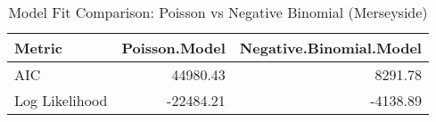 \begin{table}

\caption{\label{tab:tab:model_comparison_london}Model Fit Comparison: Poisson vs Negative Binomial (Merseyside)}
\centering
\begin{tabular}[t]{lrr}
\toprule
Metric & Poisson.Model & Negative.Binomial.Model\\
\midrule
AIC & 44980.43 & 8291.78\\
Log Likelihood & -22484.21 & -4138.89\\
\bottomrule
\end{tabular}
\end{table}
